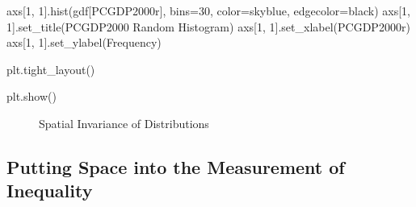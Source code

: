 \documentclass[
  a4paper, 
  twoside,
  final
]{article}
\newenvironment{Shaded}{\begin{snugshade}}{\end{snugshade}}
\newcommand{\DecValTok}[1]{\textcolor[rgb]{0.68,0.00,0.00}{#1}}
\newcommand{\NormalTok}[1]{\textcolor[rgb]{0.00,0.23,0.31}{#1}}
\newcommand{\OperatorTok}[1]{\textcolor[rgb]{0.37,0.37,0.37}{#1}}
\newcommand{\StringTok}[1]{\textcolor[rgb]{0.13,0.47,0.30}{#1}}
\begin{document}
\begin{Shaded}
\begin{Highlighting}[]
\NormalTok{axs[}\DecValTok{1}\NormalTok{, }\DecValTok{1}\NormalTok{].hist(gdf[}\StringTok{\textquotesingle{}PCGDP2000r\textquotesingle{}}\NormalTok{], bins}\OperatorTok{=}\DecValTok{30}\NormalTok{, color}\OperatorTok{=}\StringTok{\textquotesingle{}skyblue\textquotesingle{}}\NormalTok{,}
\NormalTok{               edgecolor}\OperatorTok{=}\StringTok{\textquotesingle{}black\textquotesingle{}}\NormalTok{)}
\NormalTok{axs[}\DecValTok{1}\NormalTok{, }\DecValTok{1}\NormalTok{].set\_title(}\StringTok{\textquotesingle{}PCGDP2000 Random Histogram\textquotesingle{}}\NormalTok{)}
\NormalTok{axs[}\DecValTok{1}\NormalTok{, }\DecValTok{1}\NormalTok{].set\_xlabel(}\StringTok{\textquotesingle{}PCGDP2000r\textquotesingle{}}\NormalTok{)}
\NormalTok{axs[}\DecValTok{1}\NormalTok{, }\DecValTok{1}\NormalTok{].set\_ylabel(}\StringTok{\textquotesingle{}Frequency\textquotesingle{}}\NormalTok{)}

\NormalTok{plt.tight\_layout()}

\NormalTok{plt.show()}
\end{Highlighting}
\end{Shaded}

\begin{figure}[H]


\caption{\label{fig-invariance}Spatial Invariance of Distributions}

\end{figure}%

\subsection{Putting Space into the Measurement of
Inequality}\label{putting-space-into-the-measurement-of-inequality}
\end{document}
